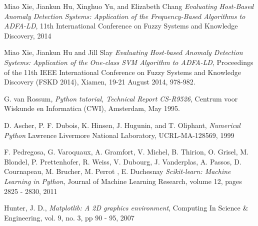 \documentclass[reqno,openany,12pt]{amsbook}
\begin{document}
\begin{thebibliography}{99}
 Miao Xie, Jiankun Hu, Xinghuo Yu, and Elizabeth Chang \emph{Evaluating Host-Based Anomaly Detection Systems: Application of the Frequency-Based Algorithms to ADFA-LD}, 11th International Conference on Fuzzy Systems and Knowledge Discovery, 2014

 Miao Xie, Jiankun Hu and Jill Slay \emph{Evaluating Host-based Anomaly Detection Systems:
Application of the One-class SVM Algorithm to ADFA-LD}, Proceedings of the 11th IEEE International Conference on Fuzzy Systems and Knowledge Discovery (FSKD 2014), Xiamen, 19-21 August 2014, 978-982. 

 G. van Rossum, \emph{Python tutorial, Technical Report CS-R9526}, Centrum voor Wiskunde en Informatica (CWI), Amsterdam, May 1995.

 D. Ascher, P. F. Dubois, K. Hinsen, J. Hugunin, and T. Oliphant,
\emph{Numerical Python} Lawrence Livermore National Laboratory, UCRL-MA-128569, 1999

 F. Pedregosa, G. Varoquaux, A. Gramfort, V. Michel, B. Thirion, O. Grisel, M. Blondel, P. Prettenhofer, R. Weiss, V. Dubourg, J. Vanderplas, A. Passos, D. Cournapeau, M. Brucher, M. Perrot , E. Duchesnay 
\emph{Scikit-learn: Machine Learning in Python}, Journal of Machine Learning Research, volume 12,
 pages 2825 - 2830, 2011

 Hunter, J. D., \emph{Matplotlib: A 2D graphics environment}, Computing In Science \& Engineering, vol. 9, no. 3, pp 90 - 95, 2007



\end{thebibliography}
\end{document}
